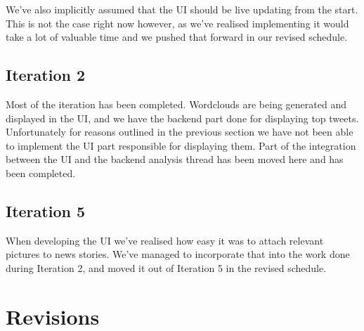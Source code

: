 \documentclass[a4paper,12pt]{article}
\begin{document}
	We've also implicitly assumed that the UI should be live updating from the start. This is not the case right now however, as we've realised implementing it would take a lot of valuable time and we pushed that forward in our revised schedule.
	
	\subsection{Iteration 2}
	Most of the iteration has been completed. Wordclouds are being generated and displayed in the UI, and we have the backend part done for displaying top tweets. Unfortunately for reasons outlined in the previous section we have not been able to implement the UI part responsible for displaying them. Part of the integration between the UI and the backend analysis thread has been moved here and has been completed.
	
	\subsection{Iteration 5}
	When developing the UI we've realised how easy it was to attach relevant pictures to news stories. We've managed to incorporate that into the work done during Iteration 2, and moved it out of Iteration 5 in the revised schedule. 
	
	\section{Revisions}
	
\end{document}
